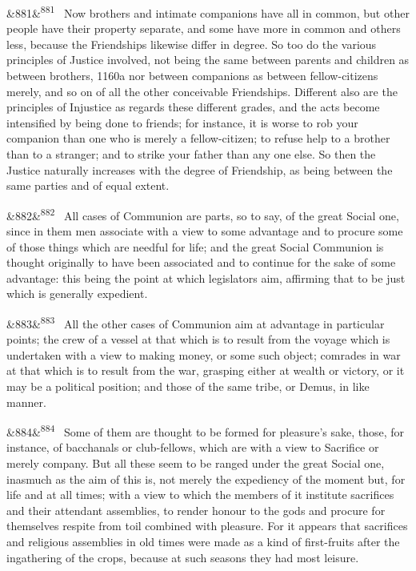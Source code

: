 \documentclass[12pt]{article}
\newcommand{\para}[1][]{\par\noindent\ifx&#1&\else\textsuperscript{\footnotesize #1}~\fi}
\begin{document}
\para[881] Now brothers and intimate companions have all in common, but other people have their property separate, and some have more in common and others less, because the Friendships likewise differ in degree. So too do the various principles of Justice involved, not being the same between parents and children as between brothers, 1160a nor between companions as between fellow-citizens merely, and so on of all the other conceivable Friendships. Different also are the principles of Injustice as regards these different grades, and the acts become intensified by being done to friends; for instance, it is worse to rob your companion than one who is merely a fellow-citizen; to refuse help to a brother than to a stranger; and to strike your father than any one else. So then the Justice naturally increases with the degree of Friendship, as being between the same parties and of equal extent.

\para[882] All cases of Communion are parts, so to say, of the great Social one, since in them men associate with a view to some advantage and to procure some of those things which are needful for life; and the great Social Communion is thought originally to have been associated and to continue for the sake of some advantage: this being the point at which legislators aim, affirming that to be just which is generally expedient.

\para[883] All the other cases of Communion aim at advantage in particular points; the crew of a vessel at that which is to result from the voyage which is undertaken with a view to making money, or some such object; comrades in war at that which is to result from the war, grasping either at wealth or victory, or it may be a political position; and those of the same tribe, or Demus, in like manner.

\para[884] Some of them are thought to be formed for pleasure's sake, those, for instance, of bacchanals or club-fellows, which are with a view to Sacrifice or merely company. But all these seem to be ranged under the great Social one, inasmuch as the aim of this is, not merely the expediency of the moment but, for life and at all times; with a view to which the members of it institute sacrifices and their attendant assemblies, to render honour to the gods and procure for themselves respite from toil combined with pleasure. For it appears that sacrifices and religious assemblies in old times were made as a kind of first-fruits after the ingathering of the crops, because at such seasons they had most leisure.
\end{document}
